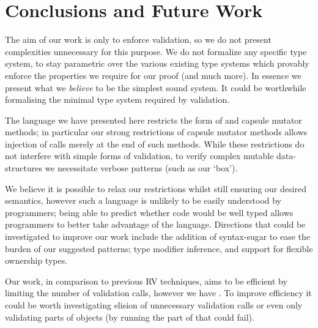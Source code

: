 \section{Conclusions and Future Work}
The aim of our work is only to enforce validation, so we do not present complexities unnecessary for this purpose. We do not formalize any specific type system, to stay parametric over 
the various existing type systems which provably enforce the properties we require for our proof (and much more).
In essence we present what we \emph{believe} to be the simplest sound system.
It could be worthwhile formalising the minimal type system required by validation.






The language we have presented here restricts the form of \validate
and capsule mutator methods; in particular
our strong restrictions of capsule mutator methods
allows injection of \validate calls merely at the end of such methods.
While these restrictions do not interfere with simple
forms of validation, to verify complex mutable data-structures we necessitate verbose patterns (such as our `box').

We believe it is possible to relax our restrictions whilst
still ensuring our desired semantics, however such a language is unlikely to be easily understood by programmers;
being able to predict whether code would be well typed allows programmers
to better take advantage of the language.
Directions that could be investigated to improve our work include the addition of syntax-sugar to ease the burden of our suggested patterns; type modifier inference, and support for flexible ownership types.

Our work, in comparison to previous RV techniques, aims to be efficient by limiting the number of validation calls, however we have .
To improve efficiency it could be worth investigating elision of unnecessary validation calls
or even only validating parts of objects (by running the part of \Q@validate@ that could fail).